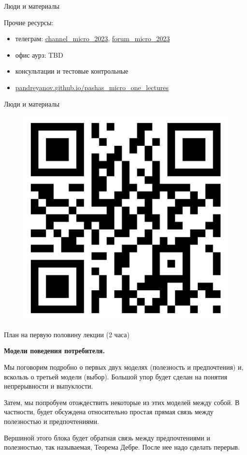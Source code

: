 \documentclass{beamer}
\begin{document}
\begin{frame}{Люди и материалы}

Прочие ресурсы:
\begin{itemize}
\item телеграм: \url{channel_micro_2023}, \url{forum_micro_2023}
\item офис аурз: TBD
\item консультации и тестовые контрольные
\item \url{pandreyanov.github.io/pashas_micro_one_lectures}
\end{itemize}

\end{frame}

\begin{frame}{Люди и материалы}

\begin{figure}[hbt]
\centering
\includegraphics[width=.7 \textwidth]{qrcode}
\end{figure}

\end{frame}


\begin{frame}{План на первую половину лекции (2 часа)}

\textbf{Модели поведения потребителя.}

Мы поговорим подробно о первых двух моделях (полезность и предпочтения) и, вскользь о третьей модели (выбор). Большой упор будет сделан на понятия непрерывности и выпуклости.

Затем, мы попробуем отождествить некоторые из этих моделей между собой. В частности, будет обсуждена относительно простая прямая связь между полезностью и предпочтениями.

Вершиной этого блока будет обратная связь между предпочтениями и полезностью, так называемая, \alert{Теорема Дебре}. После нее надо сделать перерыв.

\end{frame}
\end{document}
